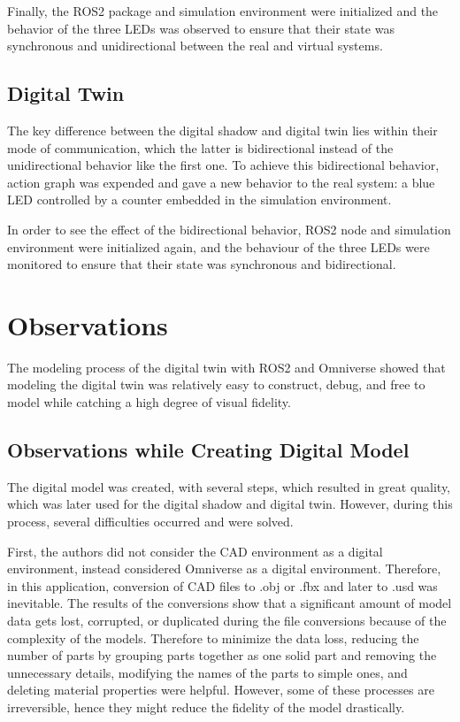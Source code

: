 \documentclass[conference]{IEEEtran}
\begin{document}
    Finally, the ROS2 package and simulation environment were initialized 
    and the behavior of the three LEDs was observed to ensure that their state was 
    synchronous and unidirectional between the real and virtual systems. 

    \subsection*{Digital Twin}\label{section:digital_twin}
    The key difference between the digital shadow and digital twin lies within their mode of communication, 
    which the latter is bidirectional instead of the unidirectional behavior like the first one.
    To achieve this bidirectional behavior, action graph was expended and gave a new 
    behavior to the real system: a blue LED  controlled by a counter embedded in the simulation environment. 

    In order to see the effect of the bidirectional behavior, ROS2 node and simulation environment 
    were initialized again, and the behaviour of the three LEDs were monitored to ensure that their state was 
    synchronous and bidirectional.

    \section{Observations}\label{section:results}
    The modeling process of the digital twin with ROS2 and Omniverse showed that modeling the digital twin was relatively easy to construct, 
    debug, and free to model while catching a high degree of visual fidelity. 
    \subsection*{Observations while Creating Digital Model}
    The digital model was created, with several steps,
    which resulted in great quality, which was later used for the digital shadow and digital twin.
    However, during this process, several difficulties occurred and were solved. 

    First, the authors did not consider the CAD environment as a digital environment, 
    instead considered Omniverse as a digital environment. 
    Therefore, in this application, conversion of CAD files to 
    .obj or .fbx and later to .usd was inevitable. The results of the conversions 
    show that a significant amount of model data gets lost, corrupted, or duplicated 
    during the file conversions because of the complexity of the models. 
    Therefore to minimize the data loss, reducing the number of parts
    by grouping parts together as one solid part and removing the unnecessary 
    details, modifying the names of the parts to simple ones, and deleting material
    properties were helpful. However, some of these processes are irreversible, 
    hence they might reduce the fidelity of the model drastically.
\end{document}
